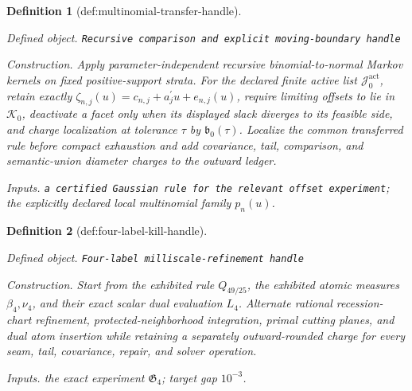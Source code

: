 \documentclass{article}
\newtheorem{definition}{Definition}
\begin{document}
\begin{definition}[def:multinomial-transfer-handle]\label{def:multinomial-transfer-handle}
\par\smallskip\noindent\emph{Defined object.} \texttt{Recursive comparison and explicit moving-\allowbreak{}boundary handle}
\par\smallskip\noindent\emph{Construction.} Apply parameter-independent recursive binomial-to-normal Markov kernels on fixed positive-support strata. For the declared finite active list \(\mathcal J_0^{\mathrm{act}}\), retain exactly \(\zeta_{n,j}(u)=c_{n,j}+a_j^{\prime}u+e_{n,j}(u)\), require limiting offsets to lie in \(\mathcal K_0\), deactivate a facet only when its displayed slack diverges to its feasible side, and charge localization at tolerance \(\tau\) by \(\mathfrak b_0(\tau)\). Localize the common transferred rule before compact exhaustion and add covariance, tail, comparison, and semantic-union diameter charges to the outward ledger.
\par\smallskip\noindent\emph{Inputs.} \texttt{a certified Gaussian rule for the relevant offset experiment}; the explicitly declared local multinomial family \(p_n(u)\).
\end{definition}

\begin{definition}[def:four-label-kill-handle]\label{def:four-label-kill-handle}
\par\smallskip\noindent\emph{Defined object.} \texttt{Four-\allowbreak{}label milliscale-\allowbreak{}refinement handle}
\par\smallskip\noindent\emph{Construction.} Start from the exhibited rule \(Q_{49/25}\), the exhibited atomic measures \(\beta_4,\nu_4\), and their exact scalar dual evaluation \(L_4\). Alternate rational recession-chart refinement, protected-neighborhood integration, primal cutting planes, and dual atom insertion while retaining a separately outward-rounded charge for every seam, tail, covariance, repair, and solver operation.
\par\smallskip\noindent\emph{Inputs.} the exact experiment \(\mathfrak G_4\); target gap \(10^{-3}\).
\end{definition}
\end{document}
